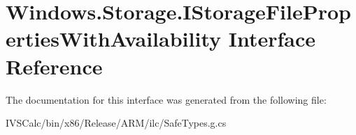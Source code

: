 \hypertarget{interface_windows_1_1_storage_1_1_i_storage_file_properties_with_availability}{}\section{Windows.\+Storage.\+I\+Storage\+File\+Properties\+With\+Availability Interface Reference}
\label{interface_windows_1_1_storage_1_1_i_storage_file_properties_with_availability}


The documentation for this interface was generated from the following file\+:\begin{DoxyCompactItemize}
\item 
I\+V\+S\+Calc/bin/x86/\+Release/\+A\+R\+M/ilc/Safe\+Types.\+g.\+cs\end{DoxyCompactItemize}

